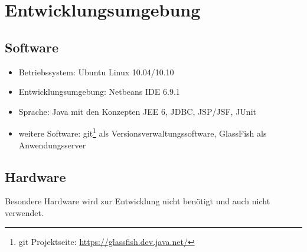 \documentclass[12pt,oneside,a4paper,bibtotoc,liststotoc,pointlessnumbers]{scrartcl}
\begin{document}
\newpage
\section{Entwicklungsumgebung}
\subsection{Software}
\begin{itemize}
\item Betriebssystem: Ubuntu Linux 10.04/10.10
\item Entwicklungsumgebung: Netbeans IDE 6.9.1
\item Sprache: Java mit den Konzepten JEE 6, JDBC, JSP/JSF, JUnit
\item weitere Software: git\footnote{git Projektseite: \url{https://glassfish.dev.java.net/}} als Versionsverwaltungssoftware, GlassFish als Anwendungsserver
\end{itemize}
\subsection{Hardware}
Besondere Hardware wird zur Entwicklung nicht benötigt und auch nicht verwendet.

\newpage

\listoffigures

\newpage

\listoftables



\newpage

\begin{appendix}



%


\end{appendix}

\end{document}
